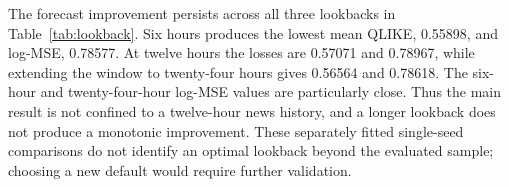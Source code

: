The forecast improvement persists across all three lookbacks in
Table~\ref{tab:lookback}. Six hours produces the lowest mean QLIKE,
0.55898, and log-MSE, 0.78577. At twelve hours the losses are
0.57071 and 0.78967, while extending the window to twenty-four
hours gives 0.56564 and 0.78618. The six-hour and twenty-four-hour
log-MSE values are particularly close. Thus the main result is not
confined to a twelve-hour news history, and a longer lookback does
not produce a monotonic improvement. These separately fitted
single-seed comparisons do not identify an optimal lookback beyond
the evaluated sample; choosing a new default would require further
validation.
